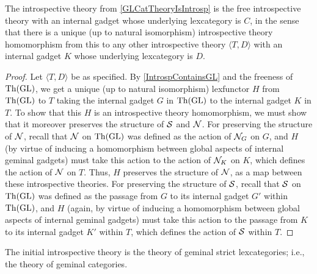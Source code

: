 \documentclass[./main.tex]{subfiles}
\begin{document}
\begin{theorem}
The introspective theory from \cref{GLCatTheoryIsIntrosp} is the free introspective theory with an internal gadget whose underlying lexcategory is $C$, in the sense that there is a unique (up to natural isomorphism) introspective theory homomorphism from this to any other introspective theory $\langle T, D \rangle$ with an internal gadget $K$ whose underlying lexcategory is $D$.
\end{theorem}
\begin{proof}
Let $\langle T, D \rangle$ be as specified. By \cref{IntrospContainsGL} and the freeness of $\mathrm{Th}(\mathrm{GL})$, we get a unique (up to natural isomorphism) lexfunctor $H$ from $\mathrm{Th}(\mathrm{GL})$ to $T$ taking the internal gadget $G$ in $\mathrm{Th}(\mathrm{GL})$ to the internal gadget $K$ in $T$. To show that this $H$ is an introspective theory homomorphism, we must show that it moreover preserves the structure of $\mathcal{S}$ and $\mathcal{N}$. For preserving the structure of $\mathcal{N}$, recall that $\mathcal{N}$ on $\mathrm{Th}(\mathrm{GL})$ was defined as the action of $\mathcal{N}_{G}$ on $G$, and $H$ (by virtue of inducing a homomorphism between global aspects of internal geminal gadgets) must take this action to the action of $\mathcal{N}_{K}$ on $K$, which defines the action of $\mathcal{N}$ on $T$. Thus, $H$ preserves the structure of $\mathcal{N}$, as a map between these introspective theories. For preserving the structure of $\mathcal{S}$, recall that $\mathcal{S}$ on $\mathrm{Th}(\mathrm{GL})$ was defined as the passage from $G$ to its internal gadget $G'$ within $\mathrm{Th}(\mathrm{GL})$, and $H$ (again, by virtue of inducing a homomorphism between global aspects of internal geminal gadgets) must take this action to the passage from $K$ to its internal gadget $K'$ within $T$, which defines the action of $\mathcal{S}$ within $T$.
\end{proof}
\begin{corollary}
The initial introspective theory is the theory of geminal strict lexcategories; i.e., the theory of geminal categories.
\end{corollary}

\end{document}
